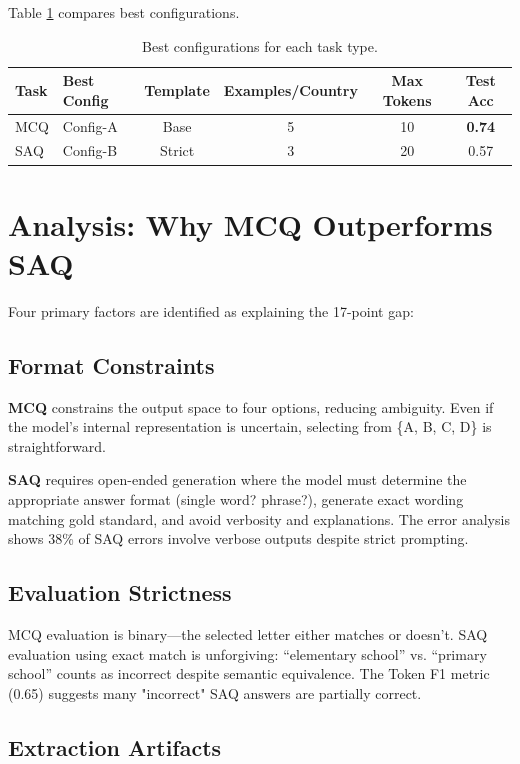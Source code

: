 \documentclass[11pt,a4paper,twocolumn]{article}
\begin{document}
Table \ref{tab:config_comparison} compares best configurations.

\begin{table}[t]
\centering
\begin{tabular}{llcccc}
\toprule
\textbf{Task} & \textbf{Best Config} & \textbf{Template} & \textbf{Examples/Country} & \textbf{Max Tokens} & \textbf{Test Acc} \\
\midrule
MCQ & Config-A & Base & 5 & 10 & \textbf{0.74} \\
SAQ & Config-B & Strict & 3 & 20 & 0.57 \\
\bottomrule
\end{tabular}
\caption{Best configurations for each task type.}
\label{tab:config_comparison}
\end{table}

\section{Analysis: Why MCQ Outperforms SAQ}

Four primary factors are identified as explaining the 17-point gap:

\subsection{Format Constraints}

\textbf{MCQ} constrains the output space to four options, reducing ambiguity. Even if the model's internal representation is uncertain, selecting from \{A, B, C, D\} is straightforward.

\textbf{SAQ} requires open-ended generation where the model must determine the appropriate answer format (single word? phrase?), generate exact wording matching gold standard, and avoid verbosity and explanations. The error analysis shows 38\% of SAQ errors involve verbose outputs despite strict prompting.

\subsection{Evaluation Strictness}

MCQ evaluation is binary—the selected letter either matches or doesn't. SAQ evaluation using exact match is unforgiving: ``elementary school'' vs. ``primary school'' counts as incorrect despite semantic equivalence. The Token F1 metric (0.65) suggests many "incorrect" SAQ answers are partially correct.

\subsection{Extraction Artifacts}
\end{document}
